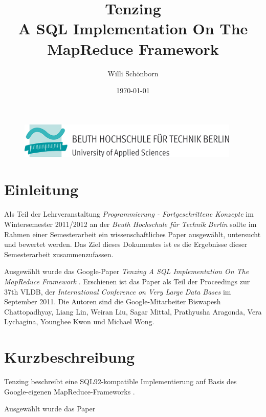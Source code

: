 \documentclass[a4paper]{article}
\title{Tenzing \\ A SQL Implementation On The MapReduce Framework}
\author{Willi Schönborn}
\date{\today}
\begin{document}
\begin{figure}[H]
\centering
\includegraphics{beuth.png}
\maketitle
\end{figure}

\section*{Einleitung}
Als Teil der Lehrveranstaltung \textit{Programmierung - Fortgeschrittene Konzepte} im Wintersemester 2011/2012 an der \textit{Beuth Hochschule für Technik Berlin} sollte im Rahmen einer Semesterarbeit ein wissenschaftliches Paper ausgewählt, untersucht und bewertet werden. Das Ziel dieses Dokumentes ist es die Ergebnisse dieser Semesterarbeit zusammenzufassen.

Ausgewählt wurde das Google-Paper \textit{Tenzing A SQL Implementation On The MapReduce Framework} \cite{TENZING}. Erschienen ist das Paper als Teil der Proceedings zur 37th VLDB, der \textit{International Conference on Very Large Data Bases} im September 2011. Die Autoren sind die Google-Mitarbeiter Biswapesh Chattopadhyay, Liang Lin, Weiran Liu, Sagar Mittal, Prathyusha Aragonda, Vera Lychagina, Younghee Kwon und Michael Wong.

\section*{Kurzbeschreibung}
Tenzing beschreibt eine SQL92-kompatible Implementierung auf Basis des Google-eigenen MapReduce-Frameworks \cite{MAPREDUCE}.

Ausgewählt wurde das Paper 

\newpage

\nocite{GFS}
\nocite{GOOGLE-TENZING}
\nocite{GOOGLE-MAPREDUCE}
\nocite{GOOGLE-GFS}
\printbibliography
\end{document}
